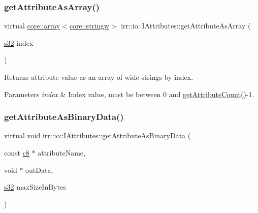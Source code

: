\subsubsection{\texorpdfstring{get\+Attribute\+As\+Array()}{getAttributeAsArray()}\hspace{0.1cm}{\footnotesize\ttfamily [2/2]}}
{\footnotesize\ttfamily virtual \hyperlink{classirr_1_1core_1_1array}{core\+::array}$<$\hyperlink{namespaceirr_1_1core_aef83fafbb1b36fcce44c07c9be23a7f2}{core\+::stringw}$>$ irr\+::io\+::\+I\+Attributes\+::get\+Attribute\+As\+Array (\begin{DoxyParamCaption}\item[{\hyperlink{namespaceirr_ac66849b7a6ed16e30ebede579f9b47c6}{s32}}]{index }\end{DoxyParamCaption})\hspace{0.3cm}{\ttfamily [pure virtual]}}



Returns attribute value as an array of wide strings by index. 


\begin{DoxyParams}{Parameters}
{\em index} & Index value, must be between 0 and \hyperlink{classirr_1_1io_1_1IAttributes_a796bdd9440ee7ba0b6742a90a82870b6}{get\+Attribute\+Count()}-\/1. \\
\hline
\end{DoxyParams}
\mbox{\label{classirr_1_1io_1_1IAttributes_acfb2d9c332942601f2e9757ddd8f999a}} 
\subsubsection{\texorpdfstring{get\+Attribute\+As\+Binary\+Data()}{getAttributeAsBinaryData()}\hspace{0.1cm}{\footnotesize\ttfamily [1/2]}}
{\footnotesize\ttfamily virtual void irr\+::io\+::\+I\+Attributes\+::get\+Attribute\+As\+Binary\+Data (\begin{DoxyParamCaption}\item[{const \hyperlink{namespaceirr_a9395eaea339bcb546b319e9c96bf7410}{c8} $\ast$}]{attribute\+Name,  }\item[{void $\ast$}]{out\+Data,  }\item[{\hyperlink{namespaceirr_ac66849b7a6ed16e30ebede579f9b47c6}{s32}}]{max\+Size\+In\+Bytes }\end{DoxyParamCaption})\hspace{0.3cm}{\ttfamily [pure virtual]}}



